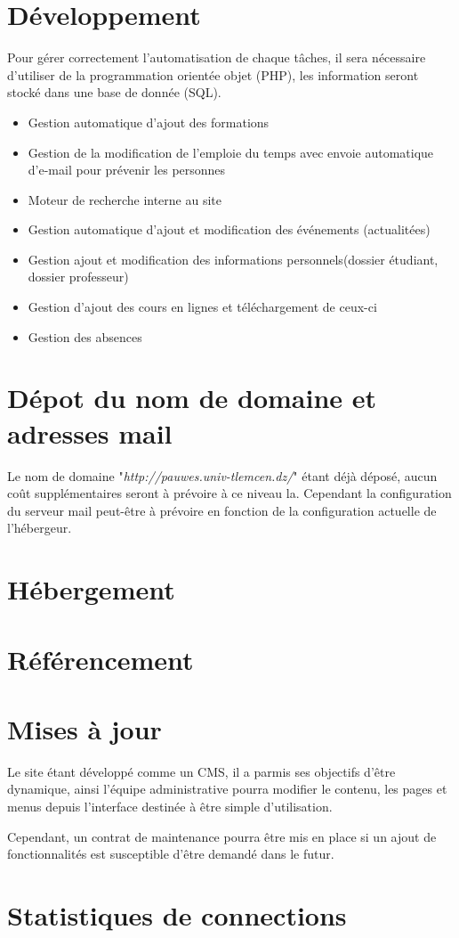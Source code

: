 \documentclass[oneside]{report}
\begin{document}
{		\section{Développement}
		\par Pour gérer correctement l’automatisation de chaque tâches, il sera nécessaire d’utiliser de la programmation orientée objet (PHP), les information seront stocké dans une base de donnée (SQL).
		\par
		\begin{itemize}
			\item Gestion automatique d’ajout des formations
			\item Gestion de la modification de l’emploie du temps avec envoie automatique d'e-mail pour prévenir les personnes
			\item Moteur de recherche interne au site
			\item Gestion automatique d’ajout et modification des événements (actualitées)
			\item Gestion ajout et modification des informations personnels(dossier étudiant, dossier professeur)
			\item Gestion d’ajout des cours en lignes et téléchargement de ceux-ci
			\item Gestion des absences
		\end{itemize}
		\section{Dépot du nom de domaine et adresses mail}
		{
			\par Le nom de domaine "\textit{http://pauwes.univ-tlemcen.dz/}" étant déjà déposé, aucun coût supplémentaires seront à prévoire à ce niveau la. Cependant la configuration du serveur mail peut-être à prévoire en fonction de la configuration actuelle de l'hébergeur.
		}
		\section{Hébergement}
		\section{Référencement}
		\section{Mises à jour}
		{
			\par Le site étant développé comme un CMS, il a parmis ses objectifs d’être dynamique, ainsi l’équipe administrative pourra modifier le contenu, les pages et menus depuis l’interface destinée à être simple d’utilisation.
			\par Cependant, un contrat de maintenance pourra être mis en place si un ajout de fonctionnalités est susceptible d’être demandé dans le futur.
		}
		\section{Statistiques de connections}
	}
\end{document}
